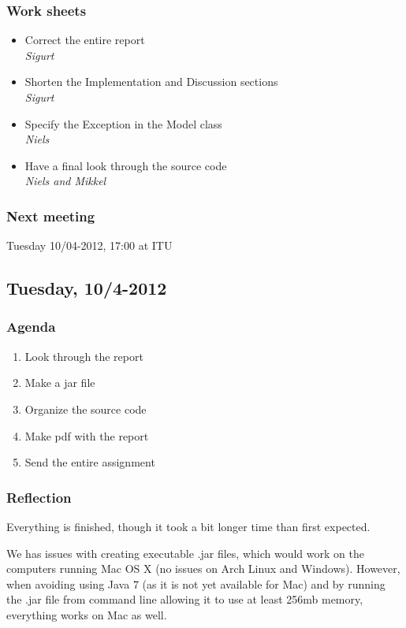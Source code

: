 \documentclass[a4paper,11pt]{article}
\begin{document}
\subsubsection*{Work sheets}
\begin{itemize}
	\item Correct the entire report \\
		\textsl{Sigurt}
	\item Shorten the Implementation and Discussion sections \\
		\textsl{Sigurt}
	\item Specify the Exception in the Model class \\
		\textsl{Niels}
	\item Have a final look through the source code \\
		\textsl{Niels and Mikkel}
\end{itemize}

\subsubsection*{Next meeting}
Tuesday 10/04-2012, 17:00 at ITU


\pagebreak
\subsection{Tuesday, 10/4-2012}

\subsubsection*{Agenda}
\begin{enumerate}
	\item Look through the report
	\item Make a jar file
	\item Organize the source code
	\item Make pdf with the report
	\item Send the entire assignment
\end{enumerate}

\subsubsection*{Reflection}
Everything is finished, though it took a bit longer time than first expected.

We has issues with creating executable .jar files, which would work on the computers running Mac OS X (no issues on Arch Linux and Windows). However, when avoiding using Java 7 (as it is not yet available for Mac) and by running the .jar file from command line allowing it to use at least 256mb memory, everything works on Mac as well.
\end{document}
